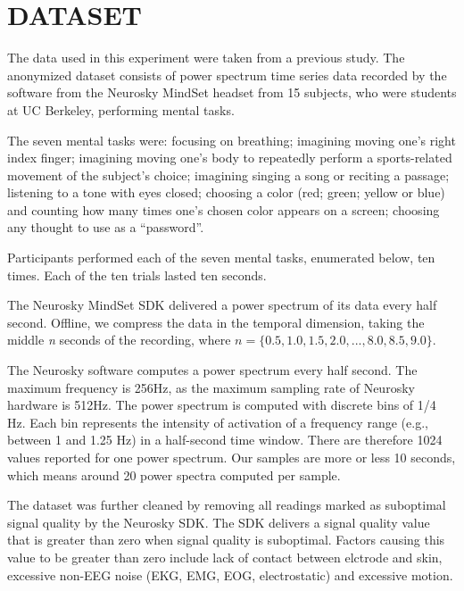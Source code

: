 
\section{\uppercase{Dataset}}

The data used in this experiment were taken from a previous study. \cite{adams_i_2013} The anonymized dataset consists of power spectrum time series data recorded by the software from the Neurosky MindSet headset from 15 subjects, who were students at UC Berkeley, performing mental tasks. 

The seven mental tasks were: focusing on breathing; imagining moving one's right index finger; imagining moving one's body to repeatedly perform a sports-related movement of the subject's choice; imagining singing a song or reciting a passage; listening to a tone with eyes closed; choosing a color (red; green; yellow or blue) and counting how many times one's chosen color appears on a screen; choosing any thought to use as a ``password''.

Participants performed each of the seven mental tasks, enumerated below, ten times. Each of the ten trials lasted ten seconds.

The Neurosky MindSet SDK delivered a power spectrum of its data every half second. Offline, we compress the data in the temporal dimension, taking the middle \textit{n} seconds of the recording, where $n = \{0.5, 1.0,1.5, 2.0,...,8.0, 8.5, 9.0\}$. 

The Neurosky software computes a power spectrum every half second. The maximum frequency is 256Hz, as the maximum sampling rate of Neurosky hardware is 512Hz. The power spectrum is computed with discrete bins of 1/4 Hz. Each bin represents the intensity of activation of a frequency range (e.g., between 1 and 1.25 Hz) in a half-second time window. There are therefore 1024 values reported for one power spectrum. Our samples are more or less 10 seconds, which means around 20 power spectra computed per sample.

The dataset was further cleaned by removing all readings marked as suboptimal signal quality by the Neurosky SDK. The SDK delivers a signal quality value that is greater than zero when signal quality is suboptimal. Factors causing this value to be greater than zero include lack of contact between elctrode and skin, excessive non-EEG noise (EKG, EMG, EOG, electrostatic) and excessive motion.